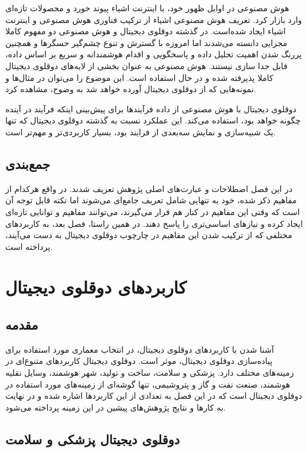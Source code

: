 هوش مصنوعی در اوایل ظهور خود، با اینترنت اشیاء
پیوند خورد و محصولات تازه‌ای وارد بازار کرد. تعریف هوش مصنوعی اشیاء
از ترکیب فناوری هوش مصنوعی و اینترنت اشیاء ایجاد شده‌است. در گذشته دوقلوی دیجیتال و هوش مصنوعی دو مفهوم کاملا مجزایی دانسته می‌شدند اما امروزه با گسترش و تنوع چشم‌گیر حسگر‌ها و همچنین پررنگ شدن اهمیت تحلیل داده‌ و پاسخگویی و اقدام هوشمندانه و سریع بر اساس داده، قابل جدا سازی نیستند. هوش مصنوعی به عنوان بخشی از لایه‌های دوقلوی دیجیتال کاملا پذیرفته شده و در حال استفاده است. این موضوع را می‌توان در مثال‌ها و نمونه‌هایی که از دوقلو‌ی دیجیتال آورده‌ خواهد شد به وضوح، مشاهده کرد.

دوقلوی‌ دیجیتال با هوش مصنوعی از داده‌ فرآیند‌ها برای پیش‌بینی اینکه فرآیند در آینده چگونه خواهد بود، استفاده می‌کند. این عملکرد نسبت به گذشته دوقلوی دیجیتال که تنها یک شبیه‌سازی و نمایش سه‌بعدی از فرایند بود، بسیار کاربردی‌تر و مهم‌تر است.

\section{جمع‌بندی}
در این فصل اصطلاحات و عبارت‌های اصلی پژوهش تعریف شدند. در واقع هرکدام از مفاهیم ذکر شده، خود به تنهایی شامل تعریف جامع‌ای می‌شوند اما نکته قابل توجه آن است که وقتی این مفاهیم در کنار هم قرار می‌گیرند، می‌توانند مفاهیم و توانایی تازه‌ای ایجاد کرده و نیاز‌های اساسی‌تری را پاسخ دهند. در همین راستا، فصل بعد، به کاربرد‌های مختلفی که از ترکیب‌ شدن این مفاهیم در چارچوب دوقلوی دیجیتال به دست می‌آیند، پرداخته است.




\chapter{کاربرد‌های دوقلوی دیجیتال}

\section{مقدمه}
آشنا شدن با کاربرد‌های دوقلوی دیجیتال، در انتخاب معماری مورد استفاده برای پیاده‌سازی دوقلوی دیجیتال، موثر است.
دوقلوی دیجیتال کاربرد‌های متنوع‌ای در زمینه‌های مختلف دارد. پزشکی و سلامت، ساخت و تولید، شهر هوشمند، وسایل نقلیه هوشمند، صنعت نفت و گاز و پتروشیمی، تنها گوشه‌ای از زمینه‌های مورد استفاده در دوقلوی دیجیتال است که در این فصل به تعدادی از این کاربرد‌ها اشاره شده و در نهایت به کار‌ها و نتایج پژوهش‌های پیشین در این زمینه پرداخته می‌شود.
\cite{b14}
\section{دوقلوی دیجیتال پزشکی‌ و سلامت}

